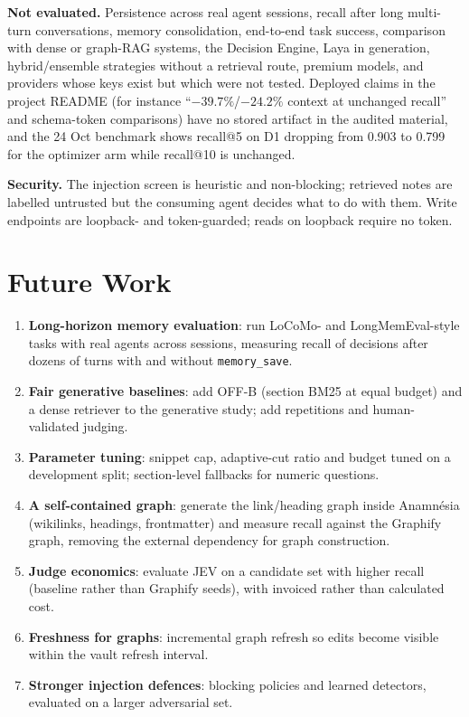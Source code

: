 \documentclass[conference,onecolumn,11pt]{IEEEtran}
\newcommand{\anam}{Anam\-n\'esia}
\begin{document}
\textbf{Not evaluated.} Persistence across real agent sessions, recall after long multi-turn conversations, memory consolidation, end-to-end task success, comparison with dense or graph-RAG systems, the Decision Engine, Laya in generation, hybrid/ensemble strategies without a retrieval route, premium models, and providers whose keys exist but which were not tested. Deployed claims in the project README (for instance ``$-39.7\%$/$-24.2\%$ context at unchanged recall'' and schema-token comparisons) have no stored artifact in the audited material, and the 24 Oct benchmark shows recall@5 on D1 dropping from 0.903 to 0.799 for the optimizer arm while recall@10 is unchanged.

\textbf{Security.} The injection screen is heuristic and non-blocking; retrieved notes are labelled untrusted but the consuming agent decides what to do with them. Write endpoints are loopback- and token-guarded; reads on loopback require no token.

\section{Future Work}\label{sec:future}
\begin{enumerate}
\item \textbf{Long-horizon memory evaluation}: run LoCoMo- and LongMemEval-style tasks \cite{maharana2024locomo,wu2025longmemeval} with real agents across sessions, measuring recall of decisions after dozens of turns with and without \texttt{memory\_save}.
\item \textbf{Fair generative baselines}: add OFF-B (section BM25 at equal budget) and a dense retriever to the generative study; add repetitions and human-validated judging.
\item \textbf{Parameter tuning}: snippet cap, adaptive-cut ratio and budget tuned on a development split; section-level fallbacks for numeric questions.
\item \textbf{A self-contained graph}: generate the link/heading graph inside \anam{} (wikilinks, headings, frontmatter) and measure recall against the Graphify graph, removing the external dependency for graph construction.
\item \textbf{Judge economics}: evaluate JEV on a candidate set with higher recall (baseline rather than Graphify seeds), with invoiced rather than calculated cost.
\item \textbf{Freshness for graphs}: incremental graph refresh so edits become visible within the vault refresh interval.
\item \textbf{Stronger injection defences}: blocking policies and learned detectors, evaluated on a larger adversarial set.
\end{enumerate}
\end{document}
